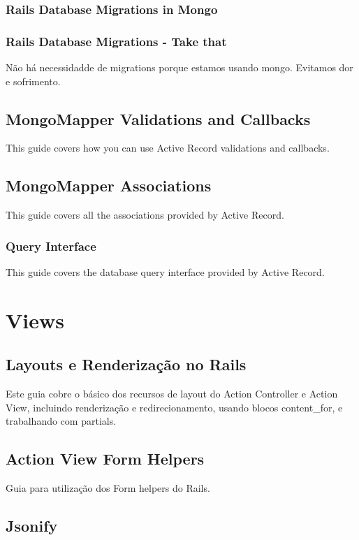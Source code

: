 \documentclass[serif,mathserif]{article}
\begin{document}
\subsubsection{Rails Database Migrations in Mongo}

\subsubsection{Rails Database Migrations - Take that}
Não há necessidadde de migrations porque estamos usando mongo.
Evitamos dor e sofrimento.

\subsection{MongoMapper Validations and Callbacks}
This guide covers how you can use Active Record validations and callbacks.

\subsection{MongoMapper Associations}
This guide covers all the associations provided by Active Record.


\subsubsection{Query Interface}
This guide covers the database query interface provided by Active Record.



\section{Views}

\subsection{Layouts e Renderização no Rails}
  Este guia cobre o básico dos recursos de layout do Action Controller e Action View,
  incluindo renderização e redirecionamento, usando blocos content\_for, e trabalhando com partials.

\subsection{Action View Form Helpers}
  Guia para utilização dos Form helpers do Rails.

\subsection{Jsonify}
\end{document}
